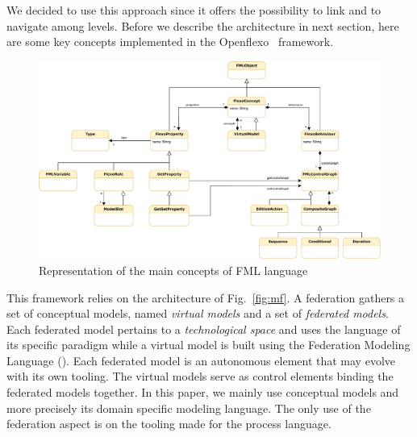 We decided to use this approach since it offers the possibility to
link and to navigate among levels. Before we describe the 
architecture in next section, here are some key concepts implemented
in the Openflexo~\parencite{openflexo_link} framework.



\begin{figure}
    \centering
    \includegraphics[width=1.0 \textwidth]{Figures/FMLMetaModel-1.5.pdf}
    \caption{Representation of the main concepts of {FML} language}
    \label{fig:mm}
\end{figure}

This framework relies on the architecture of Fig.~\ref{fig:mf}. A federation
gathers a set of conceptual models, named \emph{virtual models} and a
set of \emph{federated models}. Each federated model pertains to a
\emph{technological space} and uses the language of its specific
paradigm while a virtual model is built using the Federation Modeling
Language (\FML). Each federated model is an autonomous
element that may evolve with its own tooling. The virtual models
serve as control elements binding the federated models together.
In this paper, we mainly use conceptual models and more precisely \FML its domain specific modeling language. The only use of the federation aspect is on the tooling made for the process language.

